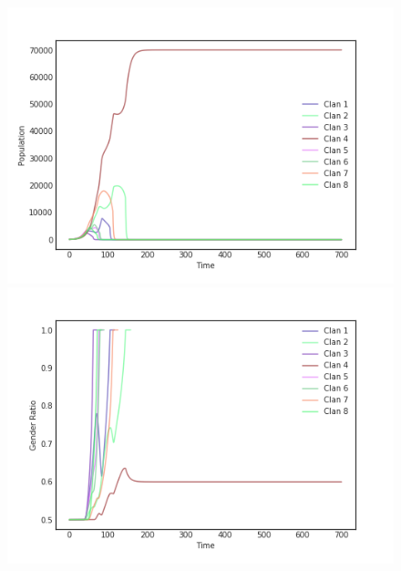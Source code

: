 \documentclass[letterpaper, 9pt, conference]{ieeeconf}  %
\begin{document}
\begin{figure}[!htb]
\begin{center}
  \includegraphics[width=\linewidth]{mclans_graph.png}
\endminipage\newline
{}
  \includegraphics[width=\linewidth]{mclans_graph_s.png}
\endminipage\newline
{}

\end{center}
\end{figure}
\end{document}
